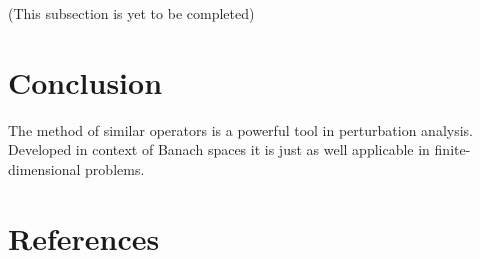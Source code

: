\documentclass[a4paper]{jpconf}
\begin{document}
(This subsection is yet to be completed)

\section*{Conclusion}
The method of similar operators
    is a powerful tool in perturbation analysis.
Developed in context of Banach spaces
    it is just as well applicable
    in finite-dimensional problems.
\section*{References}

{}
\end{document}
